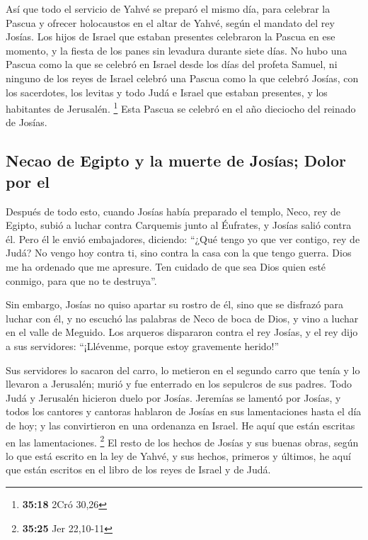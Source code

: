  Así que todo el servicio de Yahvé se preparó el mismo
día, para celebrar la Pascua y ofrecer holocaustos en el altar de Yahvé,
según el mandato del rey Josías.  Los hijos de Israel que
estaban presentes celebraron la Pascua en ese momento, y la fiesta de
los panes sin levadura durante siete días.  No hubo una
Pascua como la que se celebró en Israel desde los días del profeta
Samuel, ni ninguno de los reyes de Israel celebró una Pascua como la que
celebró Josías, con los sacerdotes, los levitas y todo Judá e Israel que
estaban presentes, y los habitantes de Jerusalén. \footnote{\textbf{35:18}
  2Cró 30,26}  Esta Pascua se celebró en el año dieciocho
del reinado de Josías.

\hypertarget{necao-de-egipto-y-la-muerte-de-josuxedas-dolor-por-el}{%
\subsection{Necao de Egipto y la muerte de Josías; Dolor por
el}\label{necao-de-egipto-y-la-muerte-de-josuxedas-dolor-por-el}}

 Después de todo esto, cuando Josías había preparado el
templo, Neco, rey de Egipto, subió a luchar contra Carquemis junto al
Éufrates, y Josías salió contra él.  Pero él le envió
embajadores, diciendo: ``¿Qué tengo yo que ver contigo, rey de Judá? No
vengo hoy contra ti, sino contra la casa con la que tengo guerra. Dios
me ha ordenado que me apresure. Ten cuidado de que sea Dios quien esté
conmigo, para que no te destruya''.

 Sin embargo, Josías no quiso apartar su rostro de él,
sino que se disfrazó para luchar con él, y no escuchó las palabras de
Neco de boca de Dios, y vino a luchar en el valle de Meguido.
 Los arqueros dispararon contra el rey Josías, y el rey
dijo a sus servidores: ``¡Llévenme, porque estoy gravemente herido!''

 Sus servidores lo sacaron del carro, lo metieron en el
segundo carro que tenía y lo llevaron a Jerusalén; murió y fue enterrado
en los sepulcros de sus padres. Todo Judá y Jerusalén hicieron duelo por
Josías.  Jeremías se lamentó por Josías, y todos los
cantores y cantoras hablaron de Josías en sus lamentaciones hasta el día
de hoy; y las convirtieron en una ordenanza en Israel. He aquí que están
escritas en las lamentaciones. \footnote{\textbf{35:25} Jer 22,10-11}
 El resto de los hechos de Josías y sus buenas obras,
según lo que está escrito en la ley de Yahvé,  y sus
hechos, primeros y últimos, he aquí que están escritos en el libro de
los reyes de Israel y de Judá.

